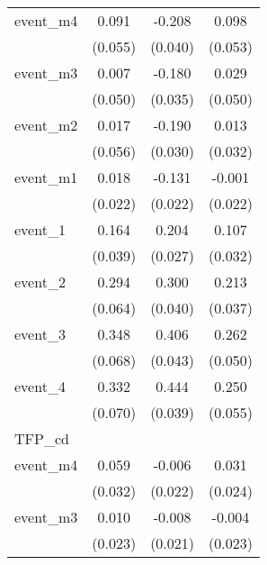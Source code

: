 {\begin{tabular}{l*{3}{c}}
event\_m4    &       0.091         &      -0.208\sym{***}&       0.098         \\
            &     (0.055)         &     (0.040)         &     (0.053)         \\
[1em]
event\_m3    &       0.007         &      -0.180\sym{***}&       0.029         \\
            &     (0.050)         &     (0.035)         &     (0.050)         \\
[1em]
event\_m2    &       0.017         &      -0.190\sym{***}&       0.013         \\
            &     (0.056)         &     (0.030)         &     (0.032)         \\
[1em]
event\_m1    &       0.018         &      -0.131\sym{***}&      -0.001         \\
            &     (0.022)         &     (0.022)         &     (0.022)         \\
[1em]
event\_1     &       0.164\sym{***}&       0.204\sym{***}&       0.107\sym{***}\\
            &     (0.039)         &     (0.027)         &     (0.032)         \\
[1em]
event\_2     &       0.294\sym{***}&       0.300\sym{***}&       0.213\sym{***}\\
            &     (0.064)         &     (0.040)         &     (0.037)         \\
[1em]
event\_3     &       0.348\sym{***}&       0.406\sym{***}&       0.262\sym{***}\\
            &     (0.068)         &     (0.043)         &     (0.050)         \\
[1em]
event\_4     &       0.332\sym{***}&       0.444\sym{***}&       0.250\sym{***}\\
            &     (0.070)         &     (0.039)         &     (0.055)         \\
\hline
TFP\_cd      &                     &                     &                     \\
event\_m4    &       0.059         &      -0.006         &       0.031         \\
            &     (0.032)         &     (0.022)         &     (0.024)         \\
[1em]
event\_m3    &       0.010         &      -0.008         &      -0.004         \\
            &     (0.023)         &     (0.021)         &     (0.023)         \\

\end{tabular}}
